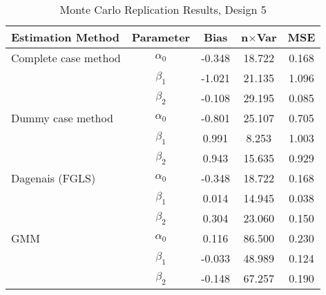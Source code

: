 \begin{table}
\centering
\caption{Monte Carlo Replication Results, Design 5}
\label{table:MCReplicationResultsDesign5}
\begin{tabular}{lcccc}
\toprule
Estimation Method & Parameter & Bias & n$\times$Var & MSE \\
\midrule
Complete case method & $\alpha_0$ & -0.348 & 18.722 & 0.168 \\
 & $\beta_1$ & -1.021 & 21.135 & 1.096 \\
 & $\beta_2$ & -0.108 & 29.195 & 0.085 \\
Dummy case method & $\alpha_0$ & -0.801 & 25.107 & 0.705 \\
 & $\beta_1$ & 0.991 & 8.253 & 1.003 \\
 & $\beta_2$ & 0.943 & 15.635 & 0.929 \\
Dagenais (FGLS) & $\alpha_0$ & -0.348 & 18.722 & 0.168 \\
 & $\beta_1$ & 0.014 & 14.945 & 0.038 \\
 & $\beta_2$ & 0.304 & 23.060 & 0.150 \\
GMM & $\alpha_0$ & 0.116 & 86.500 & 0.230 \\
 & $\beta_1$ & -0.033 & 48.989 & 0.124 \\
 & $\beta_2$ & -0.148 & 67.257 & 0.190 \\
\bottomrule
\end{tabular}
\end{table}
